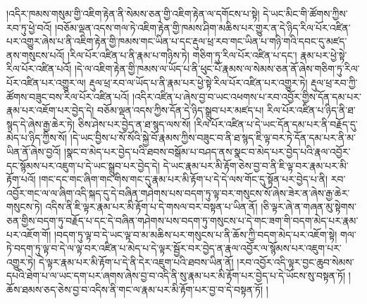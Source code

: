 །འདིར་ཁམས་གསུམ་གྱི་འཇིག་རྟེན་ནི་སེམས་ཅན་གྱི་འཇིག་རྟེན་ལ་དགོངས་པ་སྟེ། དེ་ཡང་མིང་གི་ཚོགས་ཀྱིས་རབ་ཏུ་ཕྱེ་བའོ། །བཅོམ་ལྡན་འདས་གལ་ཏེ་འཇིག་རྟེན་གྱི་ཁམས་ཤིག་མཆིས་པར་གྱུར་ན་དེ་ཉིད་རིལ་པོར་འཛིན་པར་འགྱུར་ཞེས་པ་ནི་འཇིག་རྟེན་གྱི་ཁམས་གང་ཡིན་པ་དང་རྡུལ་ཕྲ་རབ་གང་ཡིན་པ་གཉི་གའི་དབང་དུ་མཛད་ནས་གསུངས་པའོ། །རིལ་པོར་འཛིན་པ་ནི་རྣམ་པ་གཉིས་ཏེ། གཅིག་ཏུ་རིལ་པོར་འཛིན་པ་དང་། རྣམ་པར་ཕྱེ་སྟེ་རིལ་པོར་འཛིན་པའོ། །དེ་ལ་འཇིག་རྟེན་གྱི་ཁམས་ལ་ཡོད་པ་ནི་ཕུང་པོ་རྣམས་ལ་སེམས་ཅན་ནོ་ཞེས་གཅིག་ཏུ་རིལ་པོར་འཛིན་པར་འགྱུར་ལ། རྡུལ་ཕྲ་རབ་ལ་ཡོད་པ་ནི་རྣམ་པར་ཕྱེ་སྟེ་རིལ་པོར་འཛིན་པར་འགྱུར་ཏེ། རྡུལ་ཕྲ་རབ་ཀྱི་ཚོགས་བཟུང་བས་རིལ་པོར་འཛིན་པའོ། །འདིར་འཛིན་པ་ཞེས་བྱ་བ་ཡང་འཕགས་པ་རབ་འབྱོར་གྱིས་དོན་དམ་པར་རྣམ་པར་འཇོག་པར་བྱེད་དེ། བཅོམ་ལྡན་འདས་ཀྱིས་དོན་དེ་ཉིད་སྒྲུབ་པར་མཛད་པ། རིལ་པོར་འཛིན་པ་ཉིད་ནི་ཐ་སྙད་དེ་ཞེས་རྒྱ་ཆེར་ཏེ། ཅིས་ཤེས་པར་བྱེད་ན་ཐ་སྙད་ལས་སོ། །རིལ་པོར་འཛིན་པ་དེ་ཡང་དོན་དམ་པར་ནི་བརྗོད་དུ་མེད་པ་ཉིད་ཀྱིས་སོ། །དེ་ཡང་བྱིས་པ་སོ་སོའི་སྐྱེ་བོ་རྣམས་ཀྱིས་བཟུང་བ་ནི་ཐ་སྙད་ཇི་ལྟ་བར་ཏེ་དོན་དམ་པར་ནི་མ་ཡིན་ནོ་ཞེས་བྱའོ། །སྣང་བ་མེད་པར་བྱེད་པའི་ཐབས་བསྒོམ་པ་བཤད་ནས་སྣང་བ་མེད་པར་བྱེད་པའི་རྣལ་འབྱོར་དང་སྙོམས་པར་འཇུག་པ་དེ་ཡང་སྒྲུབ་པར་བྱེད་དེ། དེ་ཡང་རྣམ་པར་མི་རྟོག་ཅེས་བྱ་བ་ནི་ཇི་ལྟ་བར་རྣམ་པར་མི་རྟོག་པའོ། །གང་དང་གང་ཞིག་གང་གིས་གང་དུ་རྣམ་པར་མི་རྟོག་པ་དེ་དེ་ལས་གོང་དུ་སྟོན་པར་བྱེད་པ་ནི། རབ་འབྱོར་གང་ལ་ལ་ཞིག་འདི་སྐད་དུ་དེ་བཞིན་གཤེགས་པས་བདག་ཏུ་ལྟ་བར་གསུངས་སོ་ཞེས་ཟེར་ན་ཞེས་རྒྱ་ཆེར་གསུངས་ཏེ། འདིས་ནི་ཇི་ལྟར་རྣམ་པར་མི་རྟོག་པ་དེ་གསལ་བར་བསྟན་པ་ཡིན་ནོ། །ཅི་ལྟར་ཞེ་ན་གཞན་མུ་སྟེགས་ཅན་གྱིས་བདག་ཏུ་བརྗོད་པ་དང་དེ་བཞིན་གཤེགས་པས་བདག་ཏུ་གསུངས་པ་དེ་གང་ཟག་གི་བདག་མེད་པར་རྣམ་པར་འཇོག་གོ། །བདག་ཏུ་ལྟ་བ་དེ་ཡང་ལྟ་བ་མ་མཆིས་པར་གསུངས་པ་ནི་ཆོས་ཀྱི་བདག་མེད་པར་འཇོག་སྟེ། གལ་ཏེ་བདག་ཏུ་ལྟ་བ་དེ་ལ་ལྟ་བར་འཛིན་པ་མེད་པ་དེ་ལྟར་སྦྱོར་བར་བྱེད་ན་རྣལ་འབྱོར་ལ་སྙོམས་པར་འཇུག་པར་འགྱུར་ཏེ། དེ་ལྟར་རྣམ་པར་མི་རྟོག་པ་དེ་ནི་དེར་འཇུག་པའི་ཐབས་ཡིན་ནོ། །རབ་འབྱོར་འདི་ལྟར་བྱང་ཆུབ་སེམས་དཔའི་ཐེག་པ་ལ་ཡང་དག་པར་ཞགས་ཞེས་བྱ་བ་འདི་ནི་སུ་རྣམ་པར་མི་རྟོག་པར་བྱེད་པ་དེ་ཡོངས་སུ་བསྟན་ཏོ། །ཆོས་ཐམས་ཅད་ཅེས་བྱ་བ་འདིས་ནི་གང་ལ་རྣམ་པར་མི་རྟོག་པར་བྱ་བ་དེ་བསྟན་ཏོ། །
